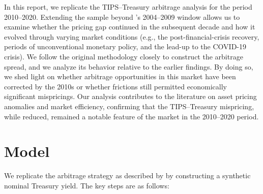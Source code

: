 \documentclass[12pt]{article}
\begin{document}
In this report, we replicate the TIPS–Treasury arbitrage analysis for the period 2010–2020. Extending the sample beyond \cite{Fleckenstein}’s 2004–2009 
window allows us to examine whether the pricing gap continued in the subsequent decade and how it evolved through varying market conditions (e.g., 
the post-financial-crisis recovery, periods of unconventional monetary policy, and the lead-up to the COVID-19 crisis). We follow the original 
methodology closely to construct the arbitrage spread, and we analyze its behavior relative to the earlier findings. By doing so, we shed light on 
whether arbitrage opportunities in this market have been corrected by the 2010s or whether frictions still permitted economically significant 
mispricings. Our analysis contributes to the literature on asset pricing anomalies and market efficiency, confirming that the TIPS–Treasury mispricing,
 while reduced, remained a notable feature of the market in the 2010–2020 period.








\section{Model}
We replicate the arbitrage strategy as described by \cite{Fleckenstein} by constructing a synthetic nominal Treasury yield. 
The key steps are as follows:  
\end{document}
